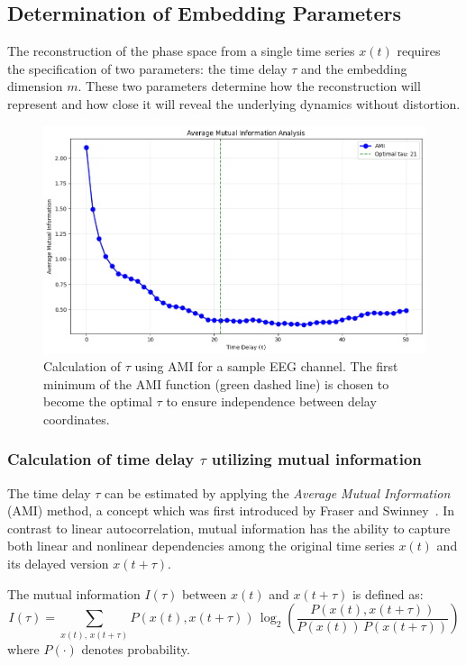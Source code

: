\documentclass{article}
\begin{document}
	

		\subsection{Determination of Embedding Parameters}
		The reconstruction of the phase space from a single time series 
		\( x(t) \) requires the specification of two parameters: 
		the time delay \( \tau \) and the embedding dimension \( m \). 
		These two parameters determine how the reconstruction will represent
		and how close it will reveal the underlying dynamics without distortion.

			\begin{figure}[H]
				    \centering
				    \includegraphics[width=0.8\linewidth]{ami.png}
				    \caption{Calculation of $\tau$ using AMI for a sample EEG channel. The first minimum of the AMI function (green dashed line) is chosen to become the optimal $\tau$ to ensure independence between delay coordinates.}
				    \label{fig:ami_plot}
			\end{figure}



		\subsubsection{Calculation of time delay \( \tau \) utilizing mutual information}
			The time delay \( \tau \) can be estimated by applying the 
			\textit{Average Mutual Information} (AMI) method, a concept which was first introduced 
			by Fraser and Swinney~\cite{fraser1986}. 
			In contrast to linear autocorrelation, 
			mutual information has the ability to capture both linear and nonlinear dependencies among
			the original time series \( x(t) \) and its delayed version \( x(t + \tau) \).

			The mutual information \( I(\tau) \) between \( x(t) \) and \( x(t + \tau) \) is defined as:
			\[
			I(\tau) = \sum_{x(t),\, x(t+\tau)} P(x(t), x(t+\tau)) \, \log_2 \left( \frac{P(x(t), x(t+\tau))}{P(x(t)) \, P(x(t+\tau))} \right)
			\]
			where \( P(\cdot) \) denotes probability.
\end{document}
